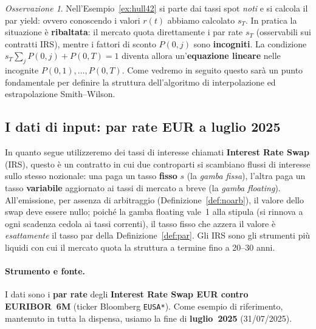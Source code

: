 \documentclass[11pt,a4paper]{article}
\theoremstyle{plain}
\theoremstyle{definition}
\theoremstyle{remark}
\newtheorem*{osservazione}{Osservazione}
\begin{document}
\begin{osservazione}
\label{oss:inversione}
Nell'Esempio~\ref{ex:hull42} si parte dai tassi spot \emph{noti} e si calcola il par
yield: ovvero conoscendo i valori $r(t)$ abbiamo calcolato $s_T$. In pratica la situazione \`e \textbf{ribaltata}:
il mercato quota direttamente i par rate $s_T$ (osservabili sui contratti IRS), mentre i
fattori di sconto $P(0,j)$ sono \textbf{incogniti}. La condizione
$s_T\sum_{j}P(0,j)+P(0,T)=1$ diventa allora un'\textbf{equazione lineare} nelle
incognite $P(0,1),\ldots,P(0,T)$. Come vedremo in seguito questo sarà un punto fondamentale per definire la struttura dell'algoritmo di interpolazione ed estrapolazione Smith--Wilson.%
\end{osservazione}



\subsection{I dati di input: par rate EUR a luglio 2025}
\label{sec:dati-input}
In quanto segue utilizzeremo dei tassi di interesse chiamati \textbf{Interest Rate Swap} (IRS), questo \`e un contratto in cui due controparti si scambiano
flussi di interesse sullo stesso nozionale: una paga un tasso \textbf{fisso} $s$ (la
\emph{gamba fissa}), l'altra paga un tasso \textbf{variabile} aggiornato ai tassi di
mercato a breve (la \emph{gamba floating}). All'emissione, per assenza di arbitraggio
(Definizione~\ref{def:noarb}), il valore dello swap deve essere nullo; poich\'e la gamba
floating vale~1 alla stipula (si rinnova a ogni scadenza cedola ai tassi correnti), il
tasso fisso che azzera il valore \`e \emph{esattamente} il tasso par della
Definizione~\ref{def:par}. Gli IRS sono gli strumenti pi\`u liquidi con cui il mercato
quota la struttura a termine fino a 20--30 anni.

\paragraph{Strumento e fonte.} I dati sono i \textbf{par rate} degli \textbf{Interest Rate
Swap EUR contro EURIBOR~6M} (ticker Bloomberg \texttt{EUSA*}). Come esempio di riferimento, mantenuto in tutta la dispensa,
usiamo la fine di \textbf{luglio~2025} (31/07/2025).
\end{document}
